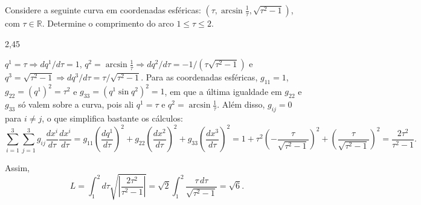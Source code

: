 \begin{question}
    Considere a seguinte curva em coordenadas esféricas: $(\tau, \arcsin \frac{1}{\tau}, \sqrt{\tau^2 - 1})$, com $\tau \in \mathbb{R}$.
    Determine o comprimento do arco $1 \le \tau \le 2$.

    \begin{answer}
      2,45
    \end{answer}

    \begin{solution}
      $q^1 = \tau \Rightarrow dq^1/d\tau = 1$, $q^2 = \arcsin \frac{1}{\tau} \Rightarrow dq^2/d\tau = -1/(\tau \sqrt{\tau^2 - 1})$ e $q^3 = \sqrt{\tau^2 - 1} \Rightarrow dq^3/d\tau = \tau/\sqrt{\tau^2 - 1}$.
      Para as coordenadas esféricas, $g_{11} = 1$, $g_{22} = (q^1)^2 = \tau^2$ e $g_{33} = (q^1 \sin q^2)^2 = 1$, em que a última igualdade em $g_{22}$ e $g_{33}$ só valem sobre a curva, pois ali $q^1 = \tau$ e $q^2 = \arcsin \frac{1}{\tau}$.
      Além disso, $g_{ij} = 0$ para $i \ne j$, o que simplifica bastante os cálculos:
      \begin{equation*}
        \sum_{i=1}^3\sum_{j=1}^3 g_{ij} \frac{dx^i}{d\tau} \frac{dx^i}{d\tau} =
          g_{11} \left(\frac{dq^1}{d\tau}\right)^2 + g_{22} \left(\frac{dx^2}{d\tau}\right)^2 + g_{33} \left(\frac{dx^3}{d\tau}\right)^2 =
          1 + \tau^2 \left(-\frac{\tau}{\sqrt{\tau^2 - 1}}\right)^2 + \left(\frac{\tau}{\sqrt{\tau^2 - 1}}\right)^2 =
          \frac{2\tau^2}{\tau^2 - 1}.
      \end{equation*}

      Assim,
      \begin{equation*}
        L = \int_1^2 d\tau \sqrt{\left|\frac{2\tau^2}{\tau^2 - 1}\right|} = \sqrt{2} \int_1^2 \frac{\tau\,d\tau}{\sqrt{\tau^2 - 1}} = \sqrt{6}.
      \end{equation*}
    \end{solution}
\end{question}